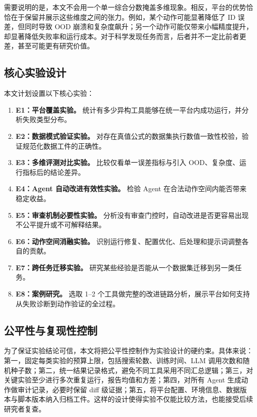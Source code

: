 \documentclass[UTF8,12pt]{ctexart}
\begin{document}
需要说明的是，本文不会用一个单一综合分数掩盖多维现象。相反，平台的优势恰恰在于保留并展示这些维度之间的张力。例如，某个动作可能显著降低了 ID 误差，但同时导致 OOD 崩溃和复杂度飙升；另一个动作可能仅带来小幅精度提升，却显著降低失败率和运行成本。对于科学发现任务而言，后者并不一定比前者更差，甚至可能更有研究价值。

\subsection{核心实验设计}

本文计划设置以下核心实验：
\begin{enumerate}
    \item \textbf{E1：平台覆盖实验。} 统计有多少异构工具能够在统一平台内成功运行，并分析失败类型分布。
    \item \textbf{E2：数据模式验证实验。} 对存在真值公式的数据集执行数值一致性校验，验证规范化数据工件的正确性。
    \item \textbf{E3：多维评测对比实验。} 比较仅看单一误差指标与引入 OOD、复杂度、运行指标后的结论差异。
    \item \textbf{E4：Agent 自动改进有效性实验。} 检验 Agent 在合法动作空间内能否带来稳定收益。
    \item \textbf{E5：审查机制必要性实验。} 分析没有审查门控时，自动改进是否更容易出现不公平提升或不可解释结果。
    \item \textbf{E6：动作空间消融实验。} 识别运行修复、配置优化、后处理和提示词调整各自的贡献。
    \item \textbf{E7：跨任务迁移实验。} 研究某些经验是否能从一个数据集迁移到另一类任务。
    \item \textbf{E8：案例研究。} 选取 1--2 个工具做完整的改进链路分析，展示平台如何支持从失败诊断到动作验证的全过程。
\end{enumerate}

\subsection{公平性与复现性控制}

为了保证实验结论可信，本文将把公平性控制作为实验设计的硬约束。具体来说：第一，固定每类实验的预算上限，包括搜索轮数、训练时间、LLM 调用次数和随机种子数；第二，统一结果记录格式，避免不同工具采用不同汇总逻辑；第三，对关键实验至少进行多次重复运行，报告均值和方差；第四，对所有 Agent 生成动作做审计记录，必要时保留 diff 级证据；第五，将平台配置、环境信息、数据版本与脚本版本纳入归档工件。这样的设计使得实验不仅能比较方法，也能接受后续研究者复查。
\end{document}
